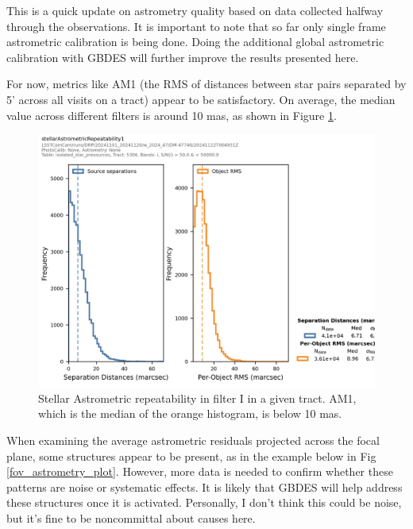 This is a quick update on astrometry quality based on data collected halfway through the \ComCam observations. It is important to note that so far only single frame astrometric calibration is being done. Doing the additional global astrometric calibration with GBDES will further improve the results presented here.


For now, metrics like AM1 (the RMS of distances between star pairs separated by 5’ across all visits on a tract) appear to be satisfactory. On average, the median value across different filters is around 10 mas, as shown in Figure \ref{AM1_plot}.

\begin{figure}
        \centering
        \includegraphics[scale=0.47]{figures/11d0c9f8-45f6-4bf2-871a-56e00e62060c}
        \caption{\small Stellar Astrometric repeatability in filter I in a given tract. AM1, which is the median of the orange histogram,  is below 10 mas.}
        \label{AM1_plot}
\end{figure}

When examining the average astrometric residuals projected across the focal plane, some structures appear to be present, as in the example below in Fig \ref{fov_astrometry_plot}. However, more data is needed to confirm whether these patterns are noise or systematic effects. It is likely that GBDES will help address these structures once it is activated. Personally, I don’t think this could be noise, but it’s fine to be noncommittal about causes here.

